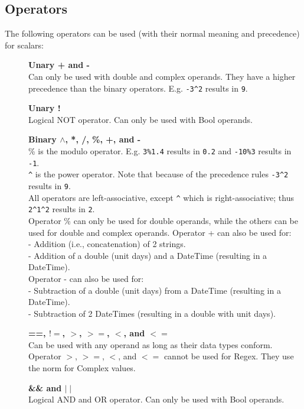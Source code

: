 \subsection{\label{TAQL:OPERATORS}Operators}
The following operators can be used (with their normal meaning and
precedence) for scalars:
\begin{description}
  \item[] \textbf{Unary + and -}
       \\Can only be used with double and complex operands.
       They have a higher precedence than the binary operators.
       E.g. \texttt{-3}\verb+^+\texttt{2} results in \texttt{9}.
  \item[] \textbf{Unary !}
       \\Logical NOT operator.
       Can only be used with Bool operands.
  \item[] \textbf{Binary $\wedge$, *, /, \%, +, and -}
       \\\% is the modulo operator.
       E.g. \texttt{3\%1.4} results in \texttt{0.2} and
       \texttt{-10\%3} results in \texttt{-1}.
       \\\verb+^+ is the power operator.
       Note that because of the precedence rules
       \texttt{-3}\verb+^+\texttt{2} results in \texttt{9}.
       \\All operators are left-associative, except \verb+^+ which is
       right-associative; thus \texttt{2}\verb+^+\texttt{1}\verb+^+\texttt{2} results in \texttt{2}.
       \\Operator \% can only be used for double operands, while the others
       can be used for double and complex operands.
       Operator + can also be used for:
       \\- Addition (i.e., concatenation) of 2 strings.
       \\- Addition of a double (unit days) and a DateTime
       (resulting in a DateTime).
       \\Operator - can also be used for:
       \\- Subtraction of a double (unit days) from a DateTime
       (resulting in a DateTime).
       \\- Subtraction of 2 DateTimes (resulting in a double with unit days).
  \item[] \textbf{==, $!=$, $>$, $>=$, $<$, and $<=$}
       \\Can be used with any operand as long as their data types conform.
       Operator $>$, $>=$, $<$, and $<=$ cannot be used for Regex.
       They use the norm for Complex values.
  \item[] \textbf{\&\& and $\mid\mid$}
       \\Logical AND and OR operator.
       Can only be used with Bool operands.
\end{description}
